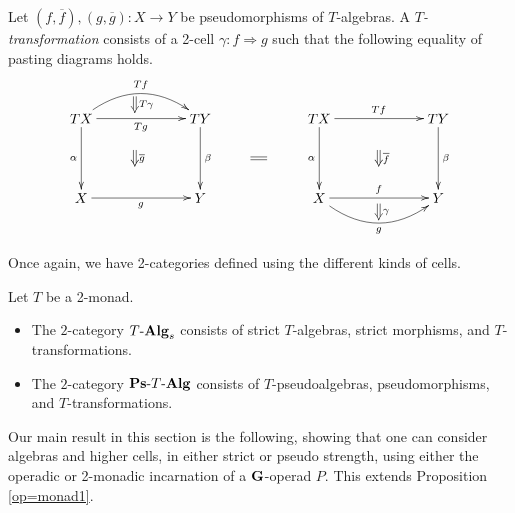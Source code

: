 \begin{Defi}
Let $(f, \overline{f}), (g, \overline{g}):X \rightarrow Y$ be pseudomorphisms of $T$-algebras.  A \textit{$T$-transformation} consists of a 2-cell $\gamma:f \Rightarrow g$ such that the following equality of pasting diagrams holds.
\[
        \xy
            (0,0)*+{TX}="00";
            (30,0)*+{TY}="10";
            (0,-20)*+{X}="01";
            (30,-20)*+{Y}="11";
            {\ar@/^1.5pc/^{Tf} "00" ; "10"};
            {\ar_{Tg} "00" ; "10"};
            {\ar^{\beta} "10" ; "11"};
            {\ar_{\alpha} "00" ; "01"};
            {\ar_{g} "01" ; "11"};
            {\ar@{=>}^{T \gamma} (13.5,5.5) ; (13.5,1.5)};
            {\ar@{=>}^{\overline{g}} (13.5,-8) ; (13.5,-12)};
            (60,0)*+{TX}="x00";
            (90,0)*+{TY}="x10";
            (60,-20)*+{X}="x01";
            (90,-20)*+{Y}="x11";
            {\ar^{Tf} "x00" ; "x10"};
            {\ar^{\beta} "x10" ; "x11"};
            {\ar_{\alpha} "x00" ; "x01"};
            {\ar^{f} "x01" ; "x11"};
            {\ar@/_1.5pc/_{g} "x01" ; "x11"};
            {\ar@{=>}^{\gamma} (75,-21.5) ; (75,-25.5)};
            {\ar@{=>}^{\overline{f}} (75,-8) ; (75,-12)};
            {\ar@{=} (42.75,-10) ; (46.75,-10)};
        \endxy
    \]
\end{Defi}

Once again, we have 2-categories defined using the different kinds of cells.

\begin{Defi}
Let $T$ be a 2-monad.
\begin{itemize}
\item The $2$-category $T\mbox{-}\mathbf{Alg}_{s}$ consists of strict $T$-algebras, strict morphisms, and $T$-transformations.
\item The $2$-category $\mathbf{Ps}\mbox{-}T\mbox{-}\mathbf{Alg}$ consists of $T$-pseudoalgebras, pseudomorphisms, and $T$-transformations.
\end{itemize}
\end{Defi}

Our main result in this section is the following, showing that one can consider algebras and higher cells, in either strict or pseudo strength, using either the operadic or 2-monadic incarnation of a $\mathbf{G}$-operad $P$.  This extends Proposition \ref{op=monad1}.

